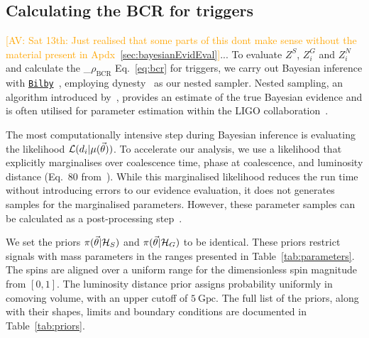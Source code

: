 \documentclass[%
 nofootinbib,
 amsmath,amssymb,
 aps,
 twocolumn
]{revtex4-2}
\newcommand{\bilby}{{\sc \href{https://lscsoft.docs.ligo.org/bilby/}{\texttt{Bilby}}}\xspace}
\newcommand{\dynesty}{{\sc dynesty}\xspace}
\newcommand{\mathcmd}[1]{{\sc \relax\ifmmode#1\else $#1$\fi}\xspace}
\newcommand{\bcr}{\mathcmd{\rho_\text{BCR}}}
\newcommand{\parameters}{\mathcmd{\vec{\theta}}}
\newcommand{\template}{\mathcmd{\mu(\parameters)}}
\newcommand{\avi}[1]{\textcolor{orange}{[AV: #1]}}
\begin{document}
\subsection{Calculating the BCR for triggers}
\avi{Sat 13th: Just realised that some parts of this dont make sense without the material present in Apdx~\ref{sec:bayesianEvidEval}}...
To evaluate $Z^S$, $Z^G_i$ and $Z^N_i$ and calculate the \bcr Eq.~\ref{eq:bcr} for triggers, we carry out Bayesian inference with \bilby~\cite{bilby, bilby_pipe}, employing \dynesty~\cite{dynesty} as our nested sampler. Nested sampling, an algorithm introduced by~\citet{skilling2004, skilling2006}, provides an estimate of the true Bayesian evidence and is often utilised for parameter estimation within the LIGO collaboration~\cite{bilby, bilby_paper, pbilby_paper}.

The most computationally intensive step during Bayesian inference is evaluating the likelihood $\mathcal{L}(d_i|\template)$. To accelerate our analysis, we use a likelihood that explicitly marginalises over coalescence time, phase at coalescence, and luminosity distance (Eq.~80 from~\citet{intro_to_gw_bayes}). While this marginalised likelihood reduces the run time without introducing errors to our evidence evaluation, it does not generates samples for the marginalised parameters. However, these parameter samples can be calculated as a post-processing step~\cite{intro_to_gw_bayes}.

We set the priors $\pi(\parameters|\mathcal{H}_S)$ and $\pi(\parameters|\mathcal{H}_G)$ to be identical. These priors restrict signals with mass parameters in the ranges presented in Table~\ref{tab:parameters}. The spins are aligned over a uniform range for the dimensionless spin magnitude from $\left[0,1\right]$. The luminosity distance prior assigns probability uniformly in comoving volume, with an upper cutoff of $5\ \text{Gpc}$. The full list of the priors, along with their shapes, limits and boundary conditions are documented in Table~\ref{tab:priors}. 
\end{document}

